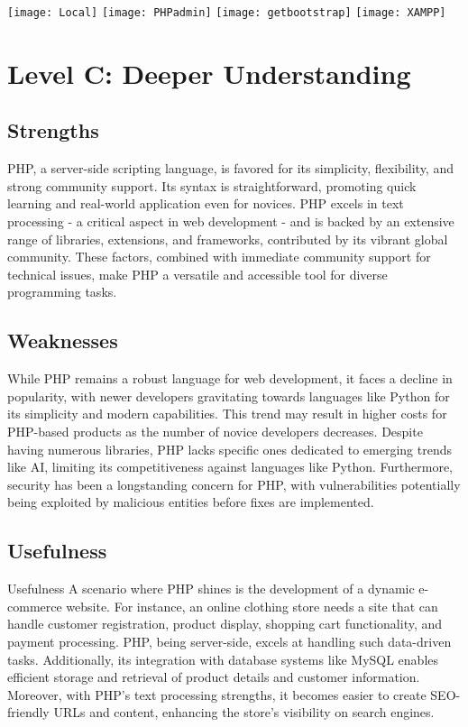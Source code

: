 \documentclass[a4paper, 11pt]{report}
\begin{document}
\texttt{[image: Local]}
\texttt{[image: PHPadmin]}
\texttt{[image: getbootstrap]}
\texttt{[image: XAMPP]}



\newpage
\section{Level C: Deeper Understanding}

\subsection{Strengths}
PHP, a server-side scripting language, is favored for its simplicity, flexibility, and strong community support. Its syntax is straightforward, promoting quick learning and real-world application even for novices. PHP excels in text processing - a critical aspect in web development - and is backed by an extensive range of libraries, extensions, and frameworks, contributed by its vibrant global community. These factors, combined with immediate community support for technical issues, make PHP a versatile and accessible tool for diverse programming tasks\cite{Ryadel}.


\subsection{Weaknesses}
While PHP remains a robust language for web development, it faces a decline in popularity, with newer developers gravitating towards languages like Python for its simplicity and modern capabilities. This trend may result in higher costs for PHP-based products as the number of novice developers decreases. Despite having numerous libraries, PHP lacks specific ones dedicated to emerging trends like AI, limiting its competitiveness against languages like Python. Furthermore, security has been a longstanding concern for PHP, with vulnerabilities potentially being exploited by malicious entities before fixes are implemented\cite{Journal}.

\subsection{Usefulness}
Usefulness A scenario where PHP shines is the development of a dynamic e-commerce website. For instance, an online clothing store needs a site that can handle customer registration, product display, shopping cart functionality, and payment processing. PHP, being server-side, excels at handling such data-driven tasks. Additionally, its integration with database systems like MySQL enables efficient storage and retrieval of product details and customer information. Moreover, with PHP's text processing strengths, it becomes easier to create SEO-friendly URLs and content, enhancing the store's visibility on search engines.
\end{document}
